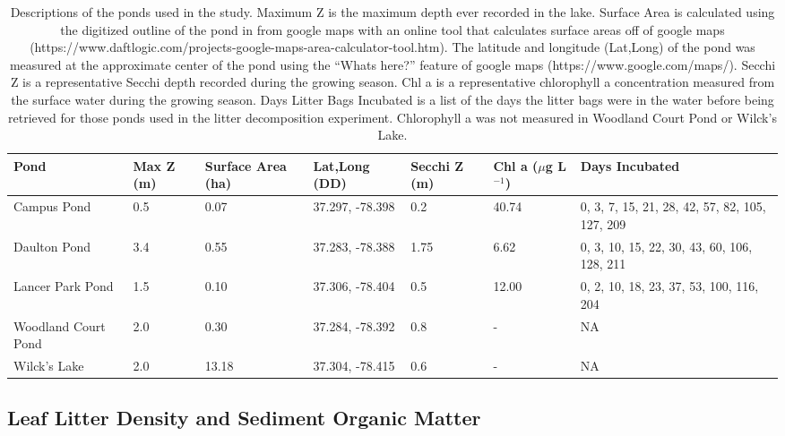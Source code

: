 \documentclass[12pt,letter]{article}
\begin{document}
\begin{center}
\begin{table}[!h] 
\tiny
\begin{tabular}{l l l l l l l}
Pond &  Max Z (m) & Surface Area (ha) & Lat,Long (DD) & Secchi Z (m) & Chl a ($\mu$g L$^{-1}$) & Days Incubated \\
\hline
Campus Pond & 0.5 & 0.07 & 37.297, -78.398 & 0.2 & 40.74 & 0, 3, 7, 15, 21, 28, 42, 57, 82, 105, 127, 209\\
Daulton Pond & 3.4 & 0.55 & 37.283, -78.388 & 1.75 & 6.62 & 0, 3, 10, 15, 22, 30, 43, 60, 106, 128, 211\\
Lancer Park Pond & 1.5 & 0.10 & 37.306, -78.404 & 0.5 & 12.00 & 0, 2, 10, 18, 23, 37, 53, 100, 116, 204\\
Woodland Court Pond & 2.0 & 0.30 & 37.284, -78.392  & 0.8 & - & NA\\
Wilck's Lake & 2.0 & 13.18 & 37.304, -78.415 & 0.6 & -  & NA\\
\hline
\end{tabular}
\caption{{\label{tab:ponds} Descriptions of the ponds used in the study. Maximum Z is the maximum depth ever recorded in the lake. Surface Area is calculated using the digitized outline of the pond in from google maps with an online tool that calculates surface areas off of google maps (https://www.daftlogic.com/projects-google-maps-area-calculator-tool.htm). The latitude and longitude (Lat,Long) of the pond was measured at the approximate center of the pond using the ``Whats here?'' feature of google maps (https://www.google.com/maps/). Secchi Z is a representative Secchi depth recorded during the growing season. Chl a is a representative chlorophyll a concentration measured from the surface water during the growing season.  Days Litter Bags Incubated is a list of the days the litter bags were in the water before being retrieved for those ponds used in the litter decomposition experiment. Chlorophyll a was not measured in Woodland Court Pond or Wilck's Lake.}}
\end{table}
\end{center}

\subsection{Leaf Litter Density and Sediment Organic Matter}
\end{document}
